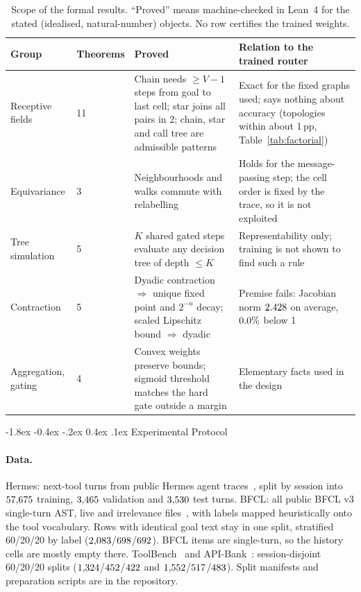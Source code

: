 \documentclass[10pt,twocolumn,letterpaper]{article}
\makeatletter
\renewcommand\section{\@startsection {section}{1}{\z@}%
  {-1.8ex \@plus -0.4ex \@minus -.2ex}%
  {0.4ex \@plus.1ex}%
  {\normalfont\normalsize\bfseries}}
\makeatother
\begin{document}
\begin{table}[t]
\centering
\footnotesize
\setlength{\tabcolsep}{3pt}
\caption{Scope of the formal results. ``Proved'' means machine-checked in Lean~4 for the stated (idealised, natural-number) objects. No row certifies the trained weights.}
\label{tab:theorem-scope}
\begin{tabularx}{\textwidth}{@{}p{2.4cm}p{1.3cm}XX@{}}
\toprule
Group & Theorems & Proved & Relation to the trained router \\
\midrule
Receptive fields & 11 & Chain needs $\ge V{-}1$ steps from goal to last cell; star joins all pairs in 2; chain, star and call tree are admissible patterns & Exact for the fixed graphs used; says nothing about accuracy (topologies within about 1\,pp, Table~\ref{tab:factorial}) \\
Equivariance & 3 & Neighbourhoods and walks commute with relabelling & Holds for the message-passing step; the cell order is fixed by the trace, so it is not exploited \\
Tree simulation & 5 & $K$ shared gated steps evaluate any decision tree of depth $\le K$ & Representability only; training is not shown to find such a rule \\
Contraction & 5 & Dyadic contraction $\Rightarrow$ unique fixed point and $2^{-n}$ decay; scaled Lipschitz bound $\Rightarrow$ dyadic & Premise fails: Jacobian norm $2.428$ on average, $0.0\%$ below 1 \\
Aggregation, gating & 4 & Convex weights preserve bounds; sigmoid threshold matches the hard gate outside a margin & Elementary facts used in the design \\
\bottomrule
\end{tabularx}
\end{table}

\section{Experimental Protocol}\label{sec:protocol}
\paragraph{Data.} Hermes: next-tool turns from public Hermes agent traces~\cite{hermestraces}, split by session into $57{,}675$ training, $3{,}465$ validation and $3{,}530$ test turns. BFCL: all public BFCL v3 single-turn AST, live and irrelevance files~\cite{gorilla-bfcl}, with labels mapped heuristically onto the tool vocabulary. Rows with identical goal text stay in one split, stratified 60/20/20 by label ($2{,}083$/$698$/$692$). BFCL items are single-turn, so the history cells are mostly empty there. ToolBench~\cite{qin2023toolllm} and API-Bank~\cite{li2023apibank}: session-disjoint 60/20/20 splits ($1{,}324$/$452$/$422$ and $1{,}552$/$517$/$483$). Split manifests and preparation scripts are in the repository.
\end{document}
